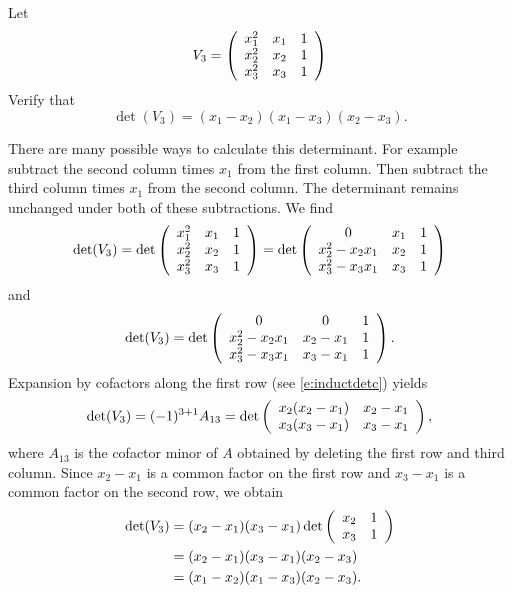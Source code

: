 \documentclass{ximera}
\begin{document}
\begin{exercise} \label{YZ_7.1_Vandermonde_b} 
Let
\[
V_3 = \left(\begin{array}{rrrrrrrrrrrrrrrrrr} x_1^2&x_1&1\\ x_2^2&x_2&1\\x_3^2&x_3&1 \end{array}\right) 
\]
Verify that 
\[
\det(V_3) = (x_1-x_2)(x_1-x_3)(x_2-x_3).
\]

\begin{solution}

\soln
There are many possible ways to calculate this determinant. For example subtract the second column times $x_1$ from the first column. Then subtract the third column times $x_1$ from the second column. The determinant remains unchanged under both of these subtractions.  We find
\[
    \det(V_3) = \det\left(\begin{array}{rrrrrrrrrrrrrrrrrr} x_1^2&x_1&1\\x_2^2&x_2&1\\x_3^2&x_3&1 \end{array}\right) =
\det\left(\begin{array}{cccccccccccc} 0&x_1&1\\x_2^2-x_2x_1&x_2&1\\x_3^2-x_3x_1&x_3&1 \end{array}\right)
\]
and 
\[
\det(V_3)=\det\left(\begin{array}{cccccccccccc} 0&0&1\\ x_2^2-x_2x_1&x_2-x_1&1\\x_3^2-x_3x_1&x_3-x_1&1 \end{array}\right).
\]
Expansion by cofactors along the first row (see \eqref{e:inductdetc}) yields
\[
\det(V_3)=(-1)^{3+1}A_{13}=\det\left(\begin{array}{rrrrrrrrrrrrrrrrrr} x_2(x_2-x_1)&x_2-x_1\\x_3(x_3-x_1)&x_3-x_1 \end{array}\right),
\]
where $A_{13}$ is the cofactor minor of $A$ obtained by deleting the first row and third column.
Since $x_2-x_1$ is a common factor on the first row and $x_3-x_1$ is a common factor on the second row, we obtain
\begin{align*}
    \det(V_3)&=(x_2-x_1)(x_3-x_1) \det\left(\begin{array}{rrrrrrrrrrrrrrrrrr} x_2&1\\x_3&1 \end{array}\right)\\
&=(x_2-x_1)(x_3-x_1)(x_2-x_3)\\
&=(x_1-x_2)(x_1-x_3)(x_2-x_3).
\end{align*}
\end{solution}
\end{exercise}
\end{document}
